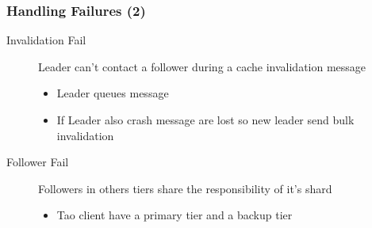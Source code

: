 \begin{frame}[c]\frametitle{Handling Failures (2)}
    \begin{description}
    	\item[Invalidation Fail] Leader can't contact a follower during a cache invalidation message
    	\begin{itemize}
    		\item Leader queues message 
    		\item If Leader also crash message are lost so new leader send bulk invalidation
    	\end{itemize}
    	\item[Follower Fail] Followers in others tiers share the responsibility of it's shard
    	\begin{itemize}
    		\item Tao client have a primary tier and a backup tier
    	\end{itemize}
    \end{description}


\end{frame}
